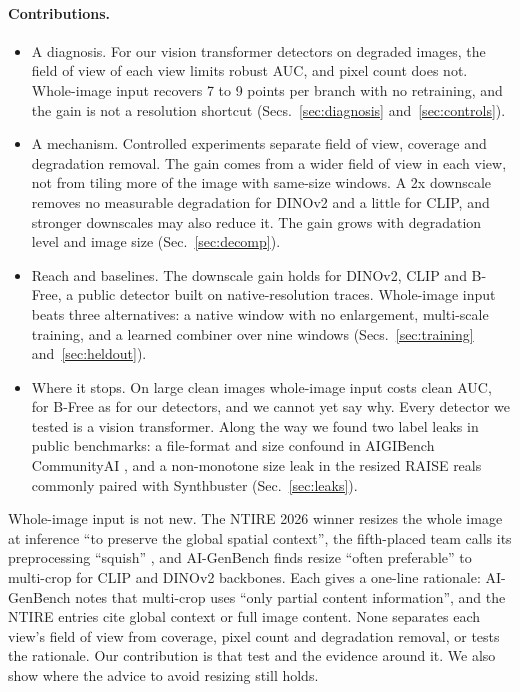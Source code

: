 \documentclass[letterpaper]{article} %
\begin{document}
\paragraph{Contributions.}
\begin{itemize}
\item A diagnosis. For our vision transformer detectors on degraded images,
  the field of view of each view limits robust AUC, and pixel count does not.
  Whole-image input recovers 7 to 9 points per branch with no retraining, and
  the gain is not a resolution shortcut (Secs.~\ref{sec:diagnosis}
  and~\ref{sec:controls}).
\item A mechanism. Controlled experiments separate field of view, coverage
  and degradation removal. The gain comes from a wider field of view in each
  view, not from tiling more of the image with same-size windows. A 2x
  downscale removes no
  measurable degradation for DINOv2 and a little for CLIP, and stronger
  downscales may also reduce it. The gain grows with degradation level and
  image size (Sec.~\ref{sec:decomp}).
\item Reach and baselines. The downscale gain holds for DINOv2, CLIP and
  B-Free, a public detector built on native-resolution traces. Whole-image
  input beats three alternatives: a native window with no enlargement,
  multi-scale training, and a learned combiner over nine windows (Secs.~\ref{sec:training}
  and~\ref{sec:heldout}).
\item Where it stops. On large clean images whole-image input costs clean
  AUC, for B-Free as for our detectors, and we cannot yet say why. Every
  detector we tested is a vision transformer. Along the way we found two label
  leaks in public benchmarks: a file-format and size confound in AIGIBench
  CommunityAI \cite{li2025aigibench}, and a non-monotone size leak in the
  resized RAISE reals commonly paired with Synthbuster
  \cite{bammey2024synthbuster} (Sec.~\ref{sec:leaks}).
\end{itemize}

Whole-image input is not new. The NTIRE 2026 winner resizes the whole image at
inference ``to preserve the global spatial context'', the fifth-placed team
calls its preprocessing ``squish'' \cite{gushchin2026ntire}, and
AI-GenBench \cite{pellegrini2025aigenbench} finds resize ``often preferable''
to multi-crop for CLIP and DINOv2 backbones. Each gives a one-line rationale:
AI-GenBench notes that multi-crop uses ``only partial content information'',
and the NTIRE entries cite global context or full image content. None
separates each view's field of view from coverage, pixel count
and degradation removal, or tests the rationale. Our contribution is that
test and the evidence around it. We also show where the advice to avoid
resizing still holds.
\end{document}
